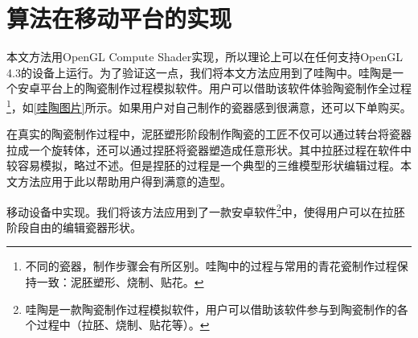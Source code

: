 \chapter{算法在移动平台的实现}
本文方法用OpenGL Compute Shader实现，所以理论上可以在任何支持OpenGL 4.3的设备上运行。为了验证这一点，我们将本文方法应用到了哇陶中。哇陶是一个安卓平台上的陶瓷制作过程模拟软件。用户可以借助该软件体验陶瓷制作全过程\footnote{不同的瓷器，制作步骤会有所区别。哇陶中的过程与常用的青花瓷制作过程保持一致：泥胚塑形、烧制、贴花。}，如\autoref{哇陶图片}所示。如果用户对自己制作的瓷器感到很满意，还可以下单购买。


在真实的陶瓷制作过程中，泥胚塑形阶段制作陶瓷的工匠不仅可以通过转台将瓷器拉成一个旋转体，还可以通过捏胚将瓷器塑造成任意形状。其中拉胚过程在软件中较容易模拟，略过不述。但是捏胚的过程是一个典型的三维模型形状编辑过程。本文方法应用于此以帮助用户得到满意的造型。




移动设备中实现。我们将该方法应用到了一款安卓软件\footnote{哇陶是一款陶瓷制作过程模拟软件，用户可以借助该软件参与到陶瓷制作的各个过程中（拉胚、烧制、贴花等）。}中，使得用户可以在拉胚阶段自由的编辑瓷器形状。

